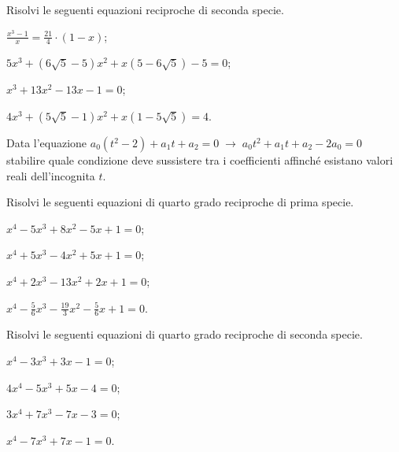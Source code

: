 \begin{esercizio}[\Ast]
\label{ese:5.44}
Risolvi le seguenti equazioni reciproche di seconda specie.
\begin{multicols}{2}
\begin{enumeratea}
\item $\frac{x^3-1} x=\frac{21} 4\cdot (1-x)$;
\item $5x^3+(6\sqrt 5-5)x^2+x(5-6\sqrt 5)-5=0$;
\item $x^3+13x^2-13x-1=0$;
\item $4x^3+(5\sqrt 5-1)x^2+x(1-5\sqrt 5)=4$.
\end{enumeratea}
\end{multicols}
\end{esercizio}

\begin{esercizio}
\label{ese:5.45}
Data l’equazione $a_0\left(t^2-2\right)+a_1t+a_2=0\;\to \;a_0t^2+a_1t+a_2-2a_0=0$ stabilire quale condizione deve sussistere tra i coefficienti affinché esistano valori reali dell'incognita $ t $.
\end{esercizio}

\begin{esercizio}[\Ast]
\label{ese:5.46}
Risolvi le seguenti equazioni di quarto grado reciproche di prima specie.
\begin{multicols}{2}
\begin{enumeratea}
\item $x^4-5x^3+8x^2-5x+1=0$;
\item $x^4+5x^3-4x^2+5x+1=0$;
\item $x^4+2x^3-13x^2+2x+1=0$;
\item $x^4-\frac 5 6x^3-\frac{19} 3x^2-\frac 5 6x+1=0$.
\end{enumeratea}
\end{multicols}
\end{esercizio}

\begin{esercizio}[\Ast]
 \label{ese:5.47}
Risolvi le seguenti equazioni di quarto grado reciproche di seconda specie.
\begin{multicols}{2}
\begin{enumeratea}
\item $x^4-3x^3+3x-1=0$;
\item $4x^4-5x^3+5x-4=0$;
\item $3x^4+7x^3-7x-3=0$;
\item $x^4-7x^3+7x-1=0$.
\end{enumeratea}
\end{multicols}
\end{esercizio}

